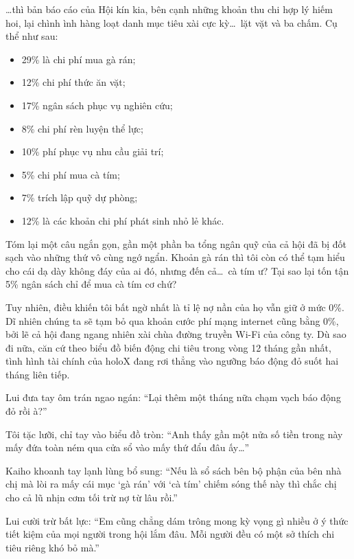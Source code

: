 \documentclass[../main.tex]{subfiles}
\begin{document}
\dots thì bản báo cáo của Hội kín kia, bên cạnh những khoản thu chi hợp lý hiếm hoi, lại chình ình hàng loạt danh mục tiêu xài cực kỳ\dots\ lặt vặt và ba chấm. Cụ thể như sau:


\begin{itemize}
    \item 29\% là chi phí mua gà rán;
    \item 12\% chi phí thức ăn vặt;
    \item 17\% ngân sách phục vụ nghiên cứu;
    \item 8\% chi phí rèn luyện thể lực;
    \item 10\% phí phục vụ nhu cầu giải trí;
    \item 5\% chi phí mua cà tím;
    \item 7\% trích lập quỹ dự phòng;
    \item 12\% là các khoản chi phí phát sinh nhỏ lẻ khác.
\end{itemize}

Tóm lại một câu ngắn gọn, gần một phần ba tổng ngân quỹ của cả hội đã bị đốt sạch vào những thứ vô cùng ngớ ngẩn. Khoản gà rán thì tôi còn có thể tạm hiểu cho cái dạ dày không đáy của ai đó, nhưng đến cả\dots\ cà tím ư? Tại sao lại tốn tận 5\% ngân sách chỉ để mua cà tím cơ chứ?

Tuy nhiên, điều khiến tôi bất ngờ nhất là tỉ lệ nợ nần của họ vẫn giữ ở mức 0\%. Dĩ nhiên chúng ta sẽ tạm bỏ qua khoản cước phí mạng internet cũng bằng 0\%, bởi lẽ cả hội đang ngang nhiên xài chùa đường truyền Wi-Fi của công ty. Dù sao đi nữa, căn cứ theo biểu đồ biến động chi tiêu trong vòng 12 tháng gần nhất, tình hình tài chính của holoX đang rơi thẳng vào ngưỡng báo động đỏ suốt hai tháng liên tiếp.

Lui đưa tay ôm trán ngao ngán: ``Lại thêm một tháng nữa chạm vạch báo động đỏ rồi à?''

Tôi tặc lưỡi, chỉ tay vào biểu đồ tròn: ``Anh thấy gần một nửa số tiền trong này mấy đứa toàn ném qua cửa sổ vào mấy thứ đẩu đâu ấy\dots''

Kaiho khoanh tay lạnh lùng bổ sung: ``Nếu là sổ sách bên bộ phận của bên nhà chị mà lòi ra mấy cái mục `gà rán' với `cà tím' chiếm sóng thế này thì chắc chị cho cả lũ nhịn cơm tối trừ nợ từ lâu rồi.''

Lui cười trừ bất lực: ``Em cũng chẳng dám trông mong kỳ vọng gì nhiều ở ý thức tiết kiệm của mọi người trong hội lắm đâu. Mỗi người đều có một sở thích chi tiêu riêng khó bỏ mà.''
\end{document}
